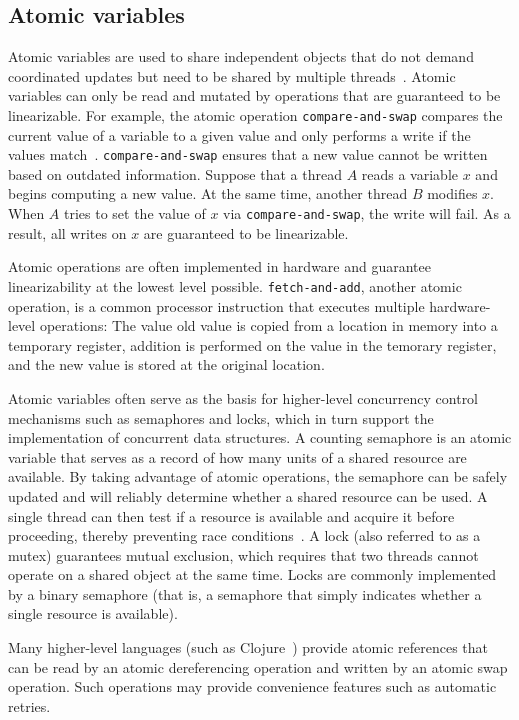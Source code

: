 \documentclass{sig-alternate}
\newcommand{\code}[1]{\texttt{#1}}
\begin{document}
\subsection{Atomic variables}

Atomic variables are used to share independent objects that do not demand coordinated updates but need to be shared by multiple threads~\cite{Swalens2014}. Atomic variables can only be read and mutated by operations that are guaranteed to be linearizable. For example, the atomic operation \code{compare-and-swap} compares the current value of a variable to a given value and only performs a write if the values match~\cite{Swalens2014}. \code{compare-and-swap} ensures that a new value cannot be written based on outdated information. Suppose that a thread $A$ reads a variable $x$ and begins computing a new value. At the same time, another thread $B$ modifies $x$. When $A$ tries to set the value of $x$ via \code{compare-and-swap}, the write will fail. As a result, all writes on $x$ are guaranteed to be linearizable.

Atomic operations are often implemented in hardware and guarantee linearizability at the lowest level possible. \code{fetch-and-add}, another atomic operation, is a common processor instruction that executes multiple hardware-level operations: The value old value is copied from a location in memory into a temporary register, addition is performed on the value in the temorary register, and the new value is stored at the original location.

Atomic variables often serve as the basis for higher-level concurrency control mechanisms such as semaphores and locks, which in turn support the implementation of concurrent data structures. A counting semaphore is an atomic variable that serves as a record of how many units of a shared resource are available. By taking advantage of atomic operations, the semaphore can be safely updated and will reliably determine whether a shared resource can be used. A single thread can then test if a resource is available and acquire it before proceeding, thereby preventing race conditions~\cite{Swalens2014}. A lock (also referred to as a mutex) guarantees mutual exclusion, which requires that two threads cannot operate on a shared object at the same time. Locks are commonly implemented by a binary semaphore (that is, a semaphore that simply indicates whether a single resource is available).

Many higher-level languages (such as Clojure~\cite{Swalens2014}) provide atomic references that can be read by an atomic dereferencing operation and written by an atomic swap operation. Such operations may provide convenience features such as automatic retries.
\end{document}
